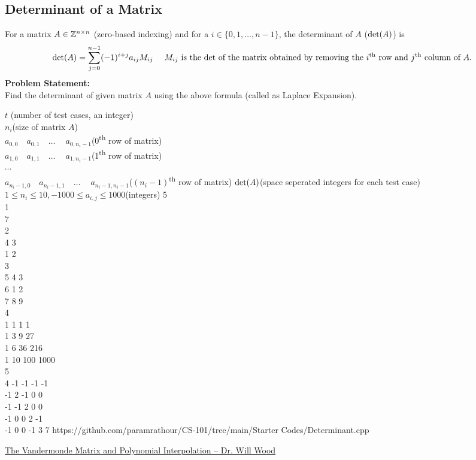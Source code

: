 \documentclass[../../Problems]{subfiles}
\begin{document}
\subsection{Determinant of a Matrix}
For a matrix $A\in \mathbb{Z}^{n\times n}$ (zero-based indexing) and for a $i\in\{0,1,\ldots,n-1\}$, the determinant of $A$ ($\operatorname{det}(A)$) is
\begin{equation}
\det(A)=\sum _{j=0}^{n-1}(-1)^{i+j}a_{ij}M_{ij}%
\quad \text{ $M_{ij}$ is the $\op{det}$ of the matrix obtained by removing the $i$\textsuperscript{th} row and $j$\textsuperscript{th} column of $A$.}%
\end{equation}
\textbf{Problem Statement:}\\
Find the determinant of given matrix $A$ using the above formula (called as Laplace Expansion).
\begin{testcases}
	{$t$ \hfill(number of test cases, an integer)\\$n_i$\hfill(size of matrix $A$)\\$a_{0,0}\quad a_{0,1}\quad \ldots \quad\ a_{0,n_i-1}$\quad\hfill(0\textsuperscript{th} row of matrix)\\$a_{1,0}\quad a_{1,1}\quad \ldots \quad\ a_{1,n_i-1}$\quad \hfill(1\textsuperscript{th} row of matrix)\\$\cdots$\\$a_{n_i-1,0}\quad a_{n_i-1,1}\quad \ldots \quad\ a_{n_i-1,n_i-1}$\hfill($(n_i-1)$\textsuperscript{th} row of matrix)}
	{$\operatorname{det}(A)$\hfill(space seperated integers for each test case)}
	{$1\leq n_i \leq 10, -1000\leq a_{i,j}\leq 1000$\hfill(integers)}
	{5\\1\\7\\2\\4 3\\1 2\\3\\5 4 3\\6 1 2\\7 8 9\\4\\1 1 1 1\\1 3 9 27\\1 6 36 216\\1 10 100 1000\\5\\4 -1 -1 -1 -1\\-1 2 -1 0 0\\-1 -1 2 0 0 \\-1 0 0 2 -1\\-1 0 0 -1 3}
	{7}
	{https://github.com/paramrathour/CS-101/tree/main/Starter Codes/Determinant.cpp}
\end{testcases}
\begin{funvideo}
	\href{https://youtu.be/Cov_kLatdlc}{The Vandermonde Matrix and Polynomial Interpolation -- Dr. Will Wood}
\end{funvideo}
\end{document}

